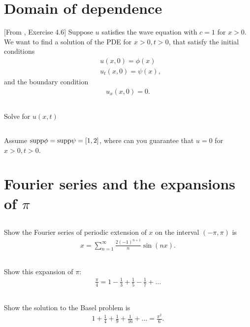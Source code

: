 \documentclass[11pt,letterpaper]{article}
\begin{document}
\section{Domain of dependence}
[From \cite{ShearerLevy_15}, Exercise 4.6] Suppose $u$ satisfies the wave equation with $c=1$ for $x>0$. We want to find a solution of the PDE for $x>0, t>0$, that satisfy the initial conditions
\begin{align}
    & u(x,0) = \phi(x)\\
    & u_t(x,0) = \psi(x),
\end{align}
and the boundary condition
\begin{align}
    u_x(x,0) = 0.
\end{align}

\subsection{}
Solve for $u(x,t)$

\subsection{}
Assume $\text{supp}\phi = \text{supp}\psi=[1,2]$, where can you guarantee that $u=0$ for $x>0, t>0$. 

\section{Fourier series and the expansions of $\pi$}
\subsection{}
Show the Fourier series of periodic extension of $x$ on the interval $(-\pi,\pi)$ is
\begin{align}
    x = \sum_{n=1}^\infty \frac{2(-1)^{n+1}}{n}\sin(nx).
\end{align}

\subsection{}
Show this expansion of $\pi$:
\begin{align}
    \frac{\pi}{4} = 1-\frac{1}{3}+\frac{1}{5}-\frac{1}{7}+\dots
\end{align}

\subsection{}
Show the solution to the Basel problem is
\begin{align}
    1+\frac{1}{4}+\frac{1}{9}+\frac{1}{16} + \dots = \frac{\pi^2}{6}.
\end{align}
\end{document}
